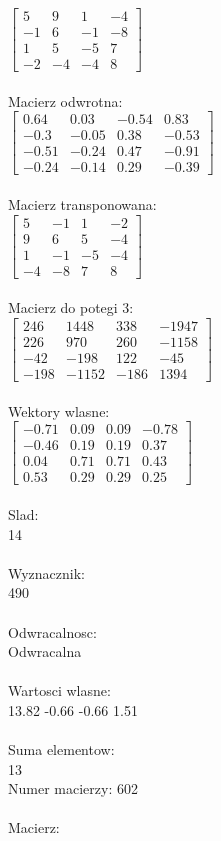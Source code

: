 \documentclass[a4paper,12pt]{article}
\begin{document}
$\begin{bmatrix} 5&9&1&-4\\-1&6&-1&-8\\1&5&-5&7\\-2&-4&-4&8 \end{bmatrix}$
\\
\\
Macierz odwrotna:\\

$\begin{bmatrix} 0.64&0.03&-0.54&0.83\\-0.3&-0.05&0.38&-0.53\\-0.51&-0.24&0.47&-0.91\\-0.24&-0.14&0.29&-0.39 \end{bmatrix}$
\\
\\
Macierz transponowana:\\

$\begin{bmatrix} 5&-1&1&-2\\9&6&5&-4\\1&-1&-5&-4\\-4&-8&7&8 \end{bmatrix}$
\\
\\
Macierz do potegi 3:\\

$\begin{bmatrix} 246&1448&338&-1947\\226&970&260&-1158\\-42&-198&122&-45\\-198&-1152&-186&1394 \end{bmatrix}$
\\
\\
Wektory wlasne:\\

$\begin{bmatrix} -0.71&0.09&0.09&-0.78\\-0.46&0.19&0.19&0.37\\0.04&0.71&0.71&0.43\\0.53&0.29&0.29&0.25 \end{bmatrix}$
\\
\\
Slad:\\
14
\\
\\
Wyznacznik:\\
490
\\
\\
Odwracalnosc:\\
Odwracalna
\\
\\
Wartosci wlasne:\\
13.82 -0.66 -0.66 1.51
\\
\\
Suma elementow:\\
13
\\
\newpage
Numer macierzy:
602
\\
\\
Macierz:\\
\end{document}

